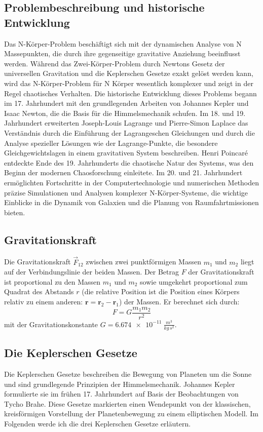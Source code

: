 \documentclass[a4paper,12pt,twoside]{article}
\begin{document}
\subsection{Problembeschreibung und historische Entwicklung}
Das N-Körper-Problem beschäftigt sich mit der dynamischen Analyse von N Massepunkten, die durch ihre gegenseitige gravitative Anziehung beeinflusst werden. Während das Zwei-Körper-Problem durch Newtons Gesetz der universellen Gravitation und die Keplerschen Gesetze exakt gelöst werden kann, wird das N-Körper-Problem für N Körper wesentlich komplexer und zeigt in der Regel chaotisches Verhalten. Die historische Entwicklung dieses Problems begann im 17. Jahrhundert mit den grundlegenden Arbeiten von Johannes Kepler und Isaac Newton, die die Basis für die Himmelsmechanik schufen. Im 18. und 19. Jahrhundert erweiterten Joseph-Louis Lagrange und Pierre-Simon Laplace das Verständnis durch die Einführung der Lagrangeschen Gleichungen und durch die Analyse spezieller Lösungen wie der Lagrange-Punkte, die besondere Gleichgewichtslagen in einem gravitativen System beschreiben. Henri Poincaré entdeckte Ende des 19. Jahrhunderts die chaotische Natur des Systems, was den Beginn der modernen Chaosforschung einleitete. Im 20. und 21. Jahrhundert ermöglichten Fortschritte in der Computertechnologie und numerischen Methoden präzise Simulationen und Analysen komplexer N-Körper-Systeme, die wichtige Einblicke in die Dynamik von Galaxien und die Planung von Raumfahrtmissionen bieten.

\subsection{Gravitationskraft}
Die Gravitationskraft $\vec{F}_{12}$ zwischen zwei punktförmigen Massen $m_1$ und $m_2$ liegt auf der Verbindungslinie der beiden Massen. Der Betrag $F$ der Gravitationskraft ist proportional zu den Massen $m_1$ und $m_2$ sowie umgekehrt proportional zum Quadrat des Abstands $r$ (die relative Position ist die Position eines Körpers relativ zu einem anderen: \(\mathbf{r} = \mathbf{r}_2 - \mathbf{r}_1\)) der Massen. Er berechnet sich durch:
\[
F = G \frac{m_1 m_2}{r^2}
\]
mit der Gravitationskonstante $G = \SI{6.674e-11}{\frac{m^3}{kg\,s^2}}$.

\subsection{Die Keplerschen Gesetze}
Die Keplerschen Gesetze beschreiben die Bewegung von Planeten um die Sonne und sind grundlegende Prinzipien der Himmelsmechanik. Johannes Kepler formulierte sie im frühen 17. Jahrhundert auf Basis der Beobachtungen von Tycho Brahe. Diese Gesetze markierten einen Wendepunkt von der klassischen, kreisförmigen Vorstellung der Planetenbewegung zu einem elliptischen Modell. Im Folgenden werde ich die drei Keplerschen Gesetze erläutern.
\end{document}
